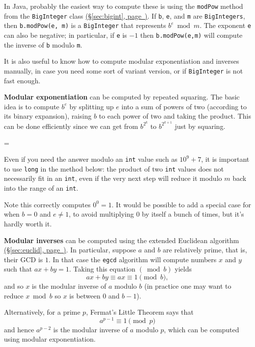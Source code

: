 \documentclass[10pt]{book}
\newcommand*{\link}[1]{\hyperref[{#1}]{(\S\ref*{#1}, page~\pageref*{#1})}}
\newenvironment{warning}
{\par\begin{mdframed}[linewidth=2pt,linecolor=red]%
    \begin{list}{}{\leftmargin=1cm
        \labelwidth=\leftmargin}\item[\Large\ding{43}]}
    {\end{list}\end{mdframed}\par}
\begin{document}
In Java, probably the easiest way to compute these is using the
\texttt{modPow} method from the \texttt{BigInteger} class
\link{sec:bigint}.  If \texttt{b}, \texttt{e}, and \texttt{m} are
\texttt{BigIntegers}, then \texttt{b.modPow(e, m)} is a
\texttt{BigInteger} that represents $b^e \bmod m$.  The exponent
\texttt{e} can also be negative; in particular, if \texttt{e} is $-1$
then \texttt{b.modPow(e,m)} will compute the inverse of
\texttt{b} modulo \texttt{m}.

It is also useful to know how to compute modular exponentiation and
inverses manually, in case you need some sort of variant version, or
if \texttt{BigInteger} is not fast enough.

\textbf{Modular exponentiation} can be computed by repeated squaring.
The basic idea is to compute $b^e$ by splitting up $e$ into a sum of
powers of two (according to its binary expansion), raising $b$ to each
power of two and taking the product.  This can be done efficiently
since we can get from $b^{2^k}$ to $b^{2^{k+1}}$ just by squaring.

  \begin{warning}
    Even if you need the answer modulo an \texttt{int} value such
    as $10^9 + 7$, it is important to use \texttt{long} in the method
    below: the product of two \texttt{int} values does not necessarily
    fit in an \texttt{int}, even if the very next step will reduce it
    modulo $m$ back into the range of an \texttt{int}.
  \end{warning}


Note this correctly computes $0^0 = 1$.  It would be possible to add a
special case for when $b = 0$ and $e \neq 1$, to avoid multiplying $0$
by itself a bunch of times, but it's hardly worth it.

\textbf{Modular inverses} can be computed using the extended Euclidean
algorithm \link{sec:euclid}.  In particular, suppose $a$ and $b$ are
relatively prime, that is, their GCD is $1$.  In that case the
\texttt{egcd} algorithm will compute numbers $x$ and $y$ such that
$ax + by = 1$.  Taking this equation $(\bmod b)$ yields \[ ax + by
  \equiv ax \equiv 1 \pmod b, \] and so $x$ is the modular inverse of
$a$ modulo $b$ (in practice one may want to reduce $x \bmod b$ so $x$
is between $0$ and $b-1$).

Alternatively, for a prime $p$, Fermat's Little Theorem says that
\[ a^{p-1} \equiv 1 \pmod p \] and hence $a^{p-2}$ is the modular
inverse of $a$ modulo $p$, which can be computed using modular
exponentiation.
\end{document}
